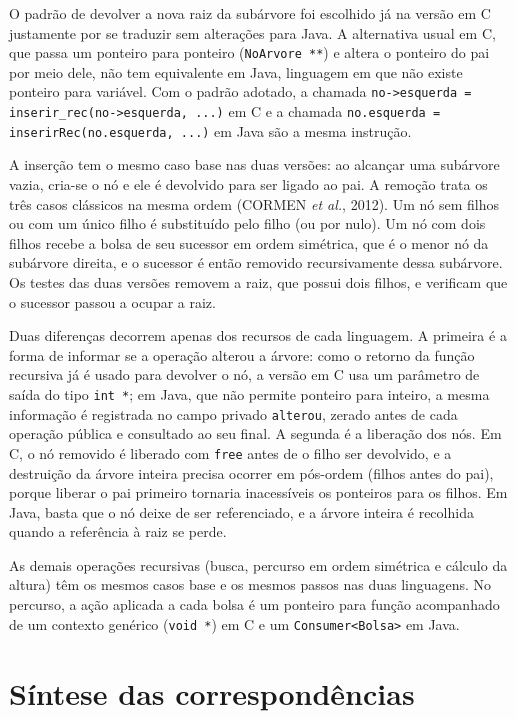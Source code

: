 \documentclass[12pt,a4paper,oneside]{report}
\newcommand{\cod}[1]{\texttt{#1}}
\begin{document}
O padrão de devolver a nova raiz da subárvore foi escolhido já na versão em C justamente por se traduzir sem alterações para Java. A alternativa usual em C, que passa um ponteiro para ponteiro (\cod{NoArvore **}) e altera o ponteiro do pai por meio dele, não tem equivalente em Java, linguagem em que não existe ponteiro para variável. Com o padrão adotado, a chamada \cod{no->esquerda = inserir\_rec(no->esquerda, ...)} em C e a chamada \cod{no.esquerda = inserirRec(no.esquerda, ...)} em Java são a mesma instrução.

A inserção tem o mesmo caso base nas duas versões: ao alcançar uma subárvore vazia, cria-se o nó e ele é devolvido para ser ligado ao pai. A remoção trata os três casos clássicos na mesma ordem (CORMEN \textit{et al.}, 2012). Um nó sem filhos ou com um único filho é substituído pelo filho (ou por nulo). Um nó com dois filhos recebe a bolsa de seu sucessor em ordem simétrica, que é o menor nó da subárvore direita, e o sucessor é então removido recursivamente dessa subárvore. Os testes das duas versões removem a raiz, que possui dois filhos, e verificam que o sucessor passou a ocupar a raiz.

Duas diferenças decorrem apenas dos recursos de cada linguagem. A primeira é a forma de informar se a operação alterou a árvore: como o retorno da função recursiva já é usado para devolver o nó, a versão em C usa um parâmetro de saída do tipo \cod{int *}; em Java, que não permite ponteiro para inteiro, a mesma informação é registrada no campo privado \cod{alterou}, zerado antes de cada operação pública e consultado ao seu final. A segunda é a liberação dos nós. Em C, o nó removido é liberado com \cod{free} antes de o filho ser devolvido, e a destruição da árvore inteira precisa ocorrer em pós-ordem (filhos antes do pai), porque liberar o pai primeiro tornaria inacessíveis os ponteiros para os filhos. Em Java, basta que o nó deixe de ser referenciado, e a árvore inteira é recolhida quando a referência à raiz se perde.

As demais operações recursivas (busca, percurso em ordem simétrica e cálculo da altura) têm os mesmos casos base e os mesmos passos nas duas linguagens. No percurso, a ação aplicada a cada bolsa é um ponteiro para função acompanhado de um contexto genérico (\cod{void *}) em C e um \cod{Consumer<Bolsa>} em Java.

\section{Síntese das correspondências}
\end{document}
